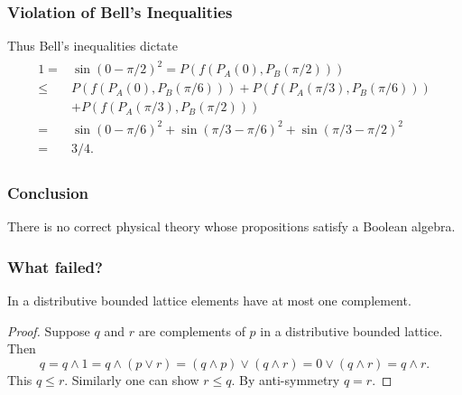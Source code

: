 \documentclass{beamer}
\begin{document}
\begin{frame}

	\frametitle{Violation of Bell's Inequalities}
	
	Thus Bell's inequalities dictate	
	\begin{align}
	\begin{split}
	1=&\sin(0-\pi/2)^2=P(f(P_A(0),P_B(\pi/2)))\\
	\leq&P(f(P_A(0),P_B(\pi/6)))+P(f(P_A(\pi/3),P_B(\pi/6)))\\
	&+P(f(P_A(\pi/3),P_B(\pi/2)))\\
	=&\sin(0-\pi/6)^2+\sin(\pi/3-\pi/6)^2+\sin(\pi/3-\pi/2)^2\\
	=&3/4.
	\end{split}
	\end{align}

\end{frame}

\begin{frame}

	\frametitle{Conclusion}
	
	\Huge There is no correct physical theory whose propositions satisfy a Boolean algebra.

\end{frame}

\begin{frame}

	\frametitle{What failed?}
	
	\begin{theorem}
		
		In a distributive bounded lattice elements have at most one complement.		
		
	\end{theorem}
	
	\begin{proof}
	
		Suppose $q$ and $r$ are complements of $p$ in a distributive bounded lattice. Then
		\begin{equation}
			q=q\wedge 1=q\wedge(p\vee r)=(q\wedge p)\vee(q\wedge r)=0\vee(q\wedge r)=q\wedge r.
		\end{equation}			
		This $q\leq r$. Similarly one can show $r\leq q$. By anti-symmetry $q=r$.
	\end{proof}
	
\end{frame}
\end{document}
